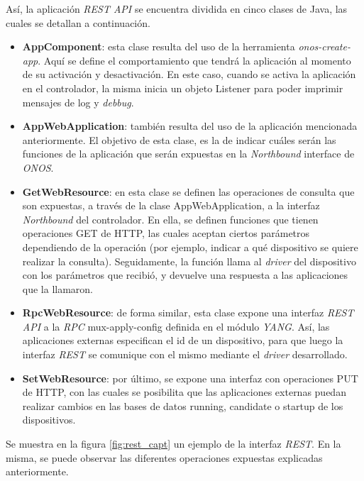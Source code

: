   Así, la aplicación \textit{REST API} se encuentra dividida en cinco clases de Java, las cuales se detallan a continuación. 


  \begin{itemize}
	\item \textbf{AppComponent}: esta clase resulta del uso de la herramienta \textit{onos-create-app}. Aquí se define el comportamiento que tendrá la aplicación al momento de su activación y desactivación. En este caso, cuando se activa la aplicación en el controlador, la misma inicia un objeto Listener para poder imprimir mensajes de log y \textit{debbug}.
    
    \item \textbf{AppWebApplication}: también resulta del uso de la aplicación mencionada anteriormente. El objetivo de esta clase, es la de indicar cuáles serán las funciones de la aplicación que serán expuestas en la \textit{Northbound} interface de \textit{ONOS}.

    \item \textbf{GetWebResource}: en esta clase se definen las operaciones de consulta que son expuestas, a través de la clase AppWebApplication, a la interfaz \textit{Northbound} del controlador. En ella, se definen funciones que tienen operaciones GET de HTTP, las cuales aceptan ciertos parámetros dependiendo de la operación (por ejemplo, indicar a qué dispositivo se quiere realizar la consulta). Seguidamente, la función llama al \textit{driver} del dispositivo con los parámetros que recibió,  y devuelve una respuesta a las aplicaciones que la llamaron.
    
    \item \textbf{RpcWebResource}: de forma similar, esta clase expone una interfaz \textit{REST API} a la \textit{RPC} mux-apply-config definida en el módulo \textit{YANG}. Así, las aplicaciones externas especifican el id de un dispositivo, para que luego la interfaz \textit{REST} se comunique con el mismo mediante el \textit{driver} desarrollado. 
    
    \item \textbf{SetWebResource}: por último, se expone una interfaz con operaciones PUT de HTTP, con las cuales se posibilita que las aplicaciones externas puedan realizar cambios en las bases de datos running, candidate o startup de los dispositivos.

\end{itemize}

Se muestra en la figura \ref{fig:rest_capt} un ejemplo de la interfaz \textit{REST}. En la misma, se puede observar las diferentes operaciones expuestas explicadas anteriormente.


